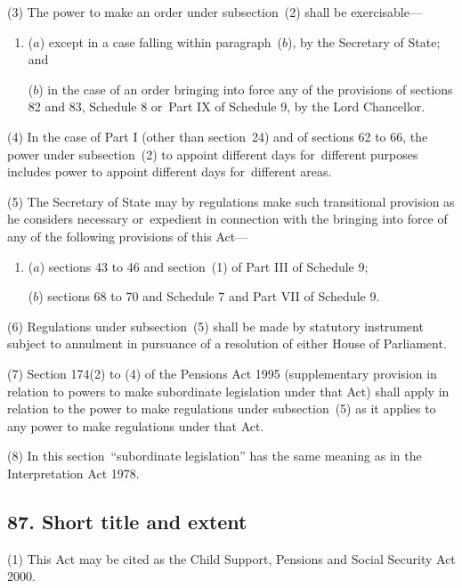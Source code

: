 \documentclass[12pt,a4paper]{article}
\begin{document}
(3) The power to make an order under subsection~(2)  shall be exercisable—
\begin{enumerate}\item[]
($a$) except in a case falling within paragraph~($b$), by the Secretary of State; and

($b$) in the case of an order bringing into force any of the provisions of sections 82 and 83, Schedule 8 or~Part IX of Schedule 9, by the Lord Chancellor.
\end{enumerate}

(4) In the case of Part I (other than section~24) and of sections 62 to 66, the power under subsection~(2)  to appoint different days for~different purposes includes power to appoint different days for~different areas.

(5) The Secretary of State may by regulations make such transitional provision as he considers necessary or~expedient in connection with the bringing into force of any of the following provisions of this Act—
\begin{enumerate}\item[]
($a$) sections 43 to 46 and section~(1)  of Part III of Schedule 9;

($b$) sections 68 to 70 and Schedule 7 and Part VII of Schedule 9. 
\end{enumerate}

(6) Regulations under subsection~(5)  shall be made by statutory instrument subject to annulment in pursuance of a resolution of either House of Parliament.

(7) Section 174(2)  to (4)  of the Pensions Act 1995 (supplementary provision in relation to powers to make subordinate legislation under that Act) shall apply in relation to the power to make regulations under subsection~(5)  as it applies to any power to make regulations under that Act.

(8) In this section~“subordinate legislation” has the same meaning as in the  Interpretation Act 1978. 

\subsection{87. Short title and extent}

(1) This Act may be cited as the Child Support, Pensions and Social Security Act 2000. 
\end{document}

